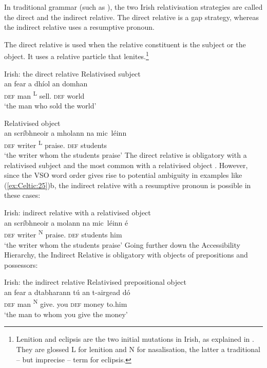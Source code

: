 \documentclass[output=paper,colorlinks,citecolor=brown]{langscibook}
\begin{document}
In traditional grammar (such as \citealt{Brothers2002}), the two Irish relativisation strategies are called the direct and the indirect relative. The direct relative is a gap strategy, whereas the indirect relative uses a resumptive pronoun.

The direct relative is used when the relative constituent is the subject or the object. It uses a relative particle that lenites.\footnote{Lenition and eclipsis are the two initial mutations in Irish, as explained in . They are glossed L for lenition and N for nasalisation, the latter a traditional -- but imprecise -- term for eclipsis.}

\ea\label{ex:Celtic:25} Irish: the direct relative \citep[5--6]{McCloskey79}
\ea Relativised subject\\
\gll an fear a dhíol  an domhan\\
\textsc{def} man {\REL}\textsuperscript{\tiny L} {sell.\PST} \textsc{def} world\\
\glt`the man who sold the world'

\ex Relativised object\\
\gll an scríbhneoir a mholann na mic~l\'einn\\
\textsc{def} writer {\REL}\textsuperscript{\tiny L} {praise.\PRS} \textsc{def} students\\
\glt`the writer whom the students praise'
\z\z
The direct relative is obligatory with a relativised subject and the most common with a relativised object \citep[6]{McCloskey79}. However, since the VSO word order gives rise to potential ambiguity in examples like (\ref{ex:Celtic:25})b, the indirect relative with a resumptive pronoun is possible in these cases:

\ea\label{ex:Celtic:26} Irish: indirect relative with a relativised object \citep[6]{McCloskey79}\\
\gll an scríbhneoir a molann na mic~l\'einn \'e\\
\textsc{def} writer {\REL}\textsuperscript{\tiny N} {praise.\PRS} \textsc{def} students him\\
\glt`the writer whom the students praise'
\z
Going further down the Accessibility Hierarchy, the Indirect Relative is obligatory with objects of prepositions and possessors: 

\ea\label{ex:Celtic:27} Irish: the indirect relative \citep[6]{McCloskey79}
\ea Relativised prepositional object\\
\gll an fear a dtabharann tú an t-airgead d\'o\\
\textsc{def} man {\REL}\textsuperscript{\tiny N} {give.\PRS} you \textsc{def} money to.him\\
\glt`the man to whom you give the money'
\end{document}
